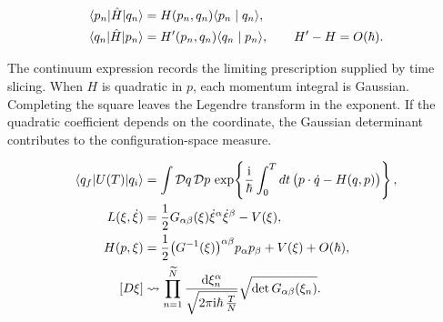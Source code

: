 \begin{align}
  \langle p_n\rvert\hat H\lvert q_n\rangle
  &=H(p_n,q_n)\langle p_n\mid q_n\rangle,
  \label{eq:253a-ch02-left-ordering}\\
  \langle q_n\rvert\hat H\lvert p_n\rangle
  &=H'(p_n,q_n)\langle q_n\mid p_n\rangle,
  \qquad H'-H=O(\hbar).
  \label{eq:253a-ch02-right-ordering}
\end{align}

The continuum expression records the limiting prescription supplied by time slicing. When $H$ is quadratic in $p$, each momentum integral is Gaussian. Completing the square leaves the Legendre transform in the exponent. If the quadratic coefficient depends on the coordinate, the Gaussian determinant contributes to the configuration-space measure.

\begin{align}
  \langle q_f\rvert U(T)\lvert q_i\rangle
  &=\int\mathcal Dq\,\mathcal Dp\,
  \exp\!\left\{\frac{\mathrm{i}}{\hbar}\int_0^Tdt\,
  \bigl(p\cdot\dot q-H(q,p)\bigr)\right\},
  \label{eq:253a-ch02-continuum-phase-space}\\
  L(\xi,\dot\xi)
  &=\frac12G_{\alpha\beta}(\xi)\dot\xi^\alpha\dot\xi^\beta-V(\xi),
  \label{eq:253a-ch02-generalized-lagrangian}\\
  H(p,\xi)
  &=\frac12\bigl(G^{-1}(\xi)\bigr)^{\alpha\beta}p_\alpha p_\beta+V(\xi)+O(\hbar),
  \label{eq:253a-ch02-generalized-hamiltonian}\\
  [D\xi]
  &\leadsto\prod_{n=1}^{\widetilde N}
  \frac{\mathop{}\!\mathrm{d}\xi_n^\alpha}{\sqrt{2\pi \mathrm{i}\hbar\,\frac{T}{N}}}
  \sqrt{\det G_{\alpha\beta}(\xi_n)}.
  \label{eq:253a-ch02-generalized-measure}
\end{align}

